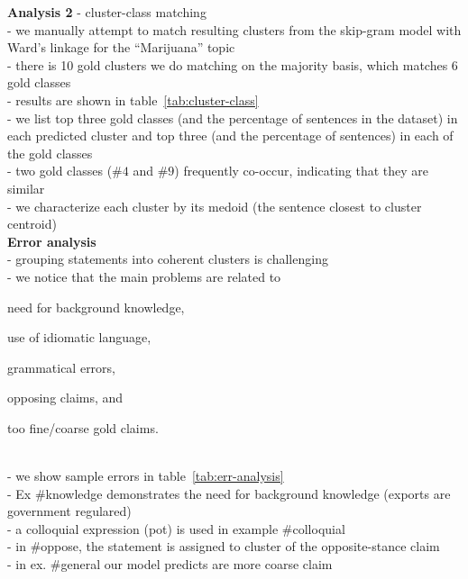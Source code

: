 \noindent \textbf{Analysis 2} - cluster-class matching \\
- we manually attempt to match resulting clusters from 
the skip-gram model with Ward's linkage for the ``Marijuana'' topic \\
- there is 10 gold clusters 
we do matching on the majority basis, which matches 6 gold classes \\
- results are shown in table~\ref{tab:cluster-class} \\
- we list top three gold classes (and the percentage of sentences in the dataset) 
in each predicted cluster and top three
(and the percentage of sentences) in each of the gold classes \\
- two gold classes  ($\#4$ and $\#9$) frequently co-occur, indicating 
that they are similar \\
- we characterize each cluster by its medoid (the sentence closest to cluster centroid)
\\

\noindent \textbf{Error analysis} \\
- grouping statements into coherent clusters is challenging \\
- we notice that the main problems are related to \begin{enumerate*}
\item need for background knowledge, 
\item use of idiomatic language, 
\item grammatical errors, 
\item opposing claims, and 
\item too fine/coarse gold claims.
\end{enumerate*} \\
- we show sample errors in table~\ref{tab:err-analysis} \\
- Ex \#knowledge demonstrates the need for background knowledge 
(exports are government regulared) \\
- a colloquial expression (pot) is used in example \#colloquial \\
- in \#oppose, the statement is assigned to cluster of the opposite-stance
claim \\
- in ex. \#general our model predicts are more coarse claim \\

